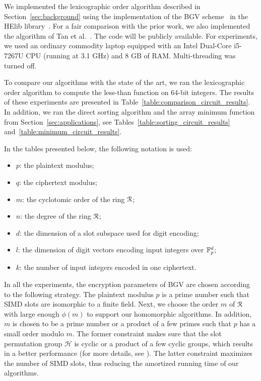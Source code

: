 We implemented the lexicographic order algorithm described in Section~\ref{sec:background} using the implementation of the BGV scheme~\cite{BGV12} in the HElib library~\cite{HElib}.
For a fair comparison with the prior work, we also implemented the algorithm of Tan et al.~\cite{TLWRK20}.
The code will be publicly available.
For experiments, we used an ordinary commodity laptop equipped with an Intel Dual-Core i5-7267U CPU (running at 3.1 GHz) and 8 GB of RAM.
Multi-threading was turned off.

To compare our algorithms with the state of the art, we ran the lexicographic order algorithm to compute the less-than function on 64-bit integers.
The results of these experiments are presented in Table~\ref{table:comparison_circuit_results}.
In addition, we ran the direct sorting algorithm and the array minimum function from Section~\ref{sec:applications}, see Tables~\ref{table:sorting_circuit_results} and~\ref{table:minimum_circuit_results}.

In the tables presented below, the following notation is used:
\begin{itemize}
  \item $p$: the plaintext modulus;
  \item $q$: the ciphertext modulus;
  \item $m$: the cyclotomic order of the ring $\mathcal{R}$;
  \item $n$: the degree of the ring $\mathcal{R}$;
  \item $d$: the dimension of a slot subspace used for digit encoding;
  \item $l$: the dimension of digit vectors encoding input integers over $\mathbb{F}_p^d$;
  \item $k$: the number of input integers encoded in one ciphertext.
\end{itemize}

In all the experiments, the encryption parameters of BGV are chosen according to the following strategy.
The plaintext modulus $p$ is a prime number such that SIMD slots are isomorphic to a finite field.
Next, we choose the order $m$ of $\mathcal{R}$ with large enough $\phi(m)$ to support our homomorphic algorithms.
In addition, $m$ is chosen to be a prime number or a product of a few primes such that $p$ has a small order modulo $m$.
The former constraint makes sure that the slot permutation group $\mathcal{H}$ is cyclic or a product of a few cyclic groups, which results in a better performance (for more details, see \cite[Appendix C.3]{GHS12}).
The latter constraint maximizes the number of SIMD slots, thus reducing the amortized running time of our algorithms.

